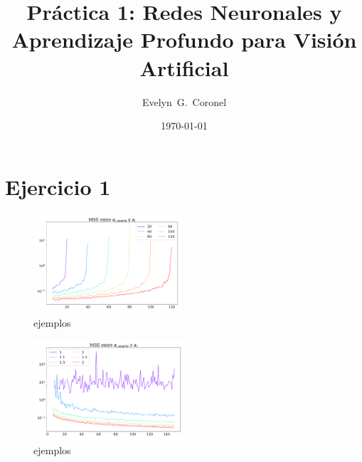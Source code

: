 





\title{Práctica 1: Redes Neuronales y Aprendizaje Profundo para Visión Artificial}
\author{Evelyn~G.~Coronel}


\date[]{\lowercase{\today}} %


\maketitle


\section*{Ejercicio 1}

    \begin{figure}[H]
        \centering
        \includegraphics[width=0.49\textwidth]{ejer_1_mse_a_ejemplos.pdf}
        \caption{ejemplos}
        \label{fig:ejer1_a_ejemplos}
    \end{figure}

    \begin{figure}[H]
        \centering
        \includegraphics[width=0.5\textwidth]{ejer_1_mse_a_porcentaje.pdf}
        \caption{ejemplos}
        \label{fig:ejer1_a_porcentaje}
    \end{figure}

